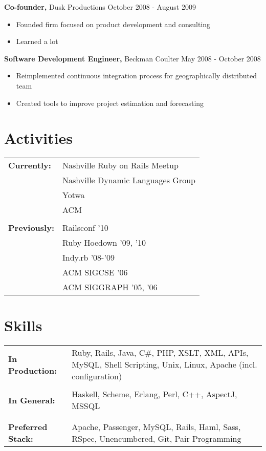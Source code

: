 \documentclass[line, margin, 10pt]{res}
\begin{document}
\begin{resume}
{\bf Co-founder,} Dusk Productions  \hfill  October 2008 - August 2009 
\begin{itemize} \itemsep -2pt %
\item Founded firm focused on product development and consulting
\item Learned a lot
\end{itemize}

{\bf Software Development Engineer,} Beckman Coulter \hfill May 2008 - October 2008
\begin{itemize} \itemsep -2pt %
\item Reimplemented continuous integration process for geographically distributed team
\item Created tools to improve project estimation and forecasting
\end{itemize}

\section{Activities}
\begin{tabular}[t]{p{1.2in} l}
\bf{Currently:} & Nashville Ruby on Rails Meetup \\
& Nashville Dynamic Languages Group \\
& Yotwa \\
& ACM \\
\\
\bf{Previously:}
& Railsconf '10 \\
& Ruby Hoedown '09, '10 \\
 & Indy.rb '08-'09 \\
& ACM SIGCSE '06 \\
& ACM SIGGRAPH '05, '06 \\
\end{tabular}

\section{Skills}
   \begin{tabular}[t]{p{1.2in} p{3.75in}}
    \bf{In Production:} & Ruby, Rails, Java, C\#, PHP, XSLT, XML, APIs, MySQL, Shell Scripting, Unix, Linux, Apache (incl. configuration) \\
    \\
    \bf{In General:} & Haskell, Scheme, Erlang, Perl, C++, AspectJ, MSSQL  \\
    \\
    \\
    \bf{Preferred Stack:} & Apache, Passenger, MySQL, Rails, Haml, Sass, RSpec, Unencumbered, Git, Pair Programming \\
 \end{tabular}

\end{resume} 
\end{document}
